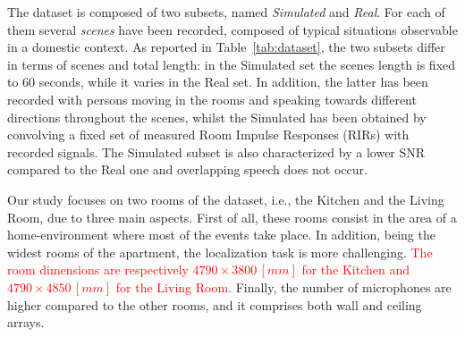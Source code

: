 \documentclass[review]{elsarticle}
\newcommand{\tableref}[1]{Table~\ref{#1}}
\begin{document}
The dataset is composed of two subsets, named \emph{Simulated} and \emph{Real}. For each of them several \textit{scenes} have been recorded, composed of typical situations observable in a domestic context. As reported in \tableref{tab:dataset}, the two subsets differ in terms of scenes and total length: in the Simulated set the scenes length is fixed to 60 seconds, while it varies in the Real set. In addition, the latter has been recorded with persons moving in the rooms and speaking towards different directions throughout the scenes, whilst the Simulated has been obtained by convolving a fixed set of measured Room Impulse Responses (RIRs) with recorded signals.
The Simulated subset is also characterized by a lower SNR compared to the Real one and overlapping speech does not occur.

Our study focuses on two rooms of the dataset, i.e.,  the Kitchen and the Living Room, due to three main aspects. First of all, these rooms consist in the area of a home-environment where most of the events take place. In addition, being the widest rooms of the apartment, the localization task is more challenging. \textcolor{red}{The room dimensions are respectively $4790 \times 3800\, \left [mm\right ]$ for the Kitchen and $4790 \times 4850\, \left [mm\right ]$ for the Living Room.}
Finally, the number of microphones are higher compared to the other rooms, and it comprises both wall and ceiling arrays.

\begin{table}[t]
	\centering
	\caption{Main differences between the Real and Simulated subsets.}
	\label{tab:dataset}
\end{table}
\end{document}
